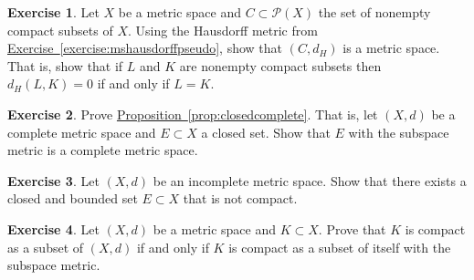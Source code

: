 \documentclass[12pt,openany]{book}
\newcommand{\abs}[1]{\left\lvert {#1} \right\rvert}
\newcommand{\R}{{\mathbb{R}}}
\newcommand{\sP}{{\mathscr{P}}}
\theoremstyle{plain}
\theoremstyle{remark}
\theoremstyle{definition}
\newenvironment{exbox}{%
    \def\FrameCommand{\vrule width 1pt \relax\hspace {10pt}}%
    \MakeFramed {\advance \hsize -\width \FrameRestore }%
}{%
    \endMakeFramed
}
\newenvironment{exparts}{%
    \leavevmode\begin{enumerate}[a),noitemsep,topsep=0pt,parsep=0pt,partopsep=0pt]
}{%
    \end{enumerate}
}
\theoremstyle{exercise}
\newtheorem{exercise}{Exercise}[section]
\theoremstyle{example}
\newcommand{\exerciseref}[1]{\hyperref[#1]{Exercise~\ref*{#1}}}
\newcommand{\propref}[1]{\hyperref[#1]{Proposition~\ref*{#1}}}
\begin{document}
\begin{exbox}
\begin{exercise}
Let $X$ be a metric space and
$C \subset \sP(X)$ the set of nonempty compact subsets of $X$.
Using the Hausdorff metric from \exerciseref{exercise:mshausdorffpseudo},
show that $(C,d_H)$ is a metric space.  That is, show that
if $L$ and $K$ are nonempty compact subsets then $d_H(L,K) = 0$
if and only if $L=K$.
\end{exercise}

\begin{exercise} \label{exercise:closedcomplete}
Prove \propref{prop:closedcomplete}.  That is,
let $(X,d)$ be a complete metric space and $E \subset X$ a closed set.
Show that $E$ with the subspace metric is a complete metric space.
\end{exercise}

\begin{exercise}
Let $(X,d)$ be an incomplete metric space.  Show that there exists a
closed and bounded set $E \subset X$ that is not compact.
\end{exercise}

\begin{exercise}
Let $(X,d)$ be a metric space and $K \subset X$.
Prove that $K$ is compact as a subset of $(X,d)$ if and only if $K$ is
compact as a subset of itself with the subspace metric.
\end{exercise}



\end{exbox}
\end{document}
